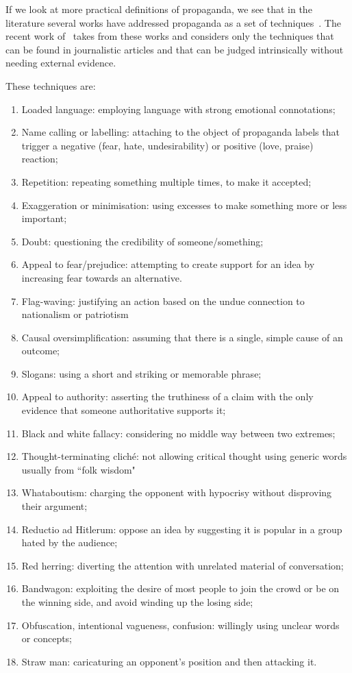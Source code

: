 If we look at more practical definitions of propaganda, we see that in the literature several works have addressed propaganda as a set of techniques~\citep{torok2015symbiotic,miller1939techniques,weston2018rulebook}. The recent work of~\citet{da2019fine} takes from these works and considers only the techniques that can be found in journalistic articles and that can be judged intrinsically without needing external evidence.

These techniques are:
\begin{enumerate}
    \item Loaded language: employing language with strong emotional connotations;
    \item Name calling or labelling: attaching to the object of propaganda labels that trigger a negative (fear, hate, undesirability) or positive (love, praise) reaction;
    \item Repetition: repeating something multiple times, to make it accepted;
    \item Exaggeration or minimisation: using excesses to make something more or less important;
    \item Doubt: questioning the credibility of someone/something;
    \item Appeal to fear/prejudice: attempting to create support for an idea by increasing fear towards an alternative.
    \item Flag-waving: justifying an action based on the undue connection to nationalism or patriotism
    \item Causal oversimplification: assuming that there is a single, simple cause of an outcome;
    \item Slogans: using a short and striking or memorable phrase;
    \item Appeal to authority: asserting the truthiness of a claim with the only evidence that someone authoritative supports it;
    \item Black and white fallacy: considering no middle way between two extremes;
    \item Thought-terminating cliché: not allowing critical thought using generic words usually from ``folk wisdom"
    \item Whataboutism: charging the opponent with hypocrisy without disproving their argument;
    \item Reductio ad Hitlerum: oppose an idea by suggesting it is popular in a group hated by the audience;
    \item Red herring: diverting the attention with unrelated material of conversation;
    \item Bandwagon: exploiting the desire of most people to join the crowd or be on the winning side, and avoid winding up the losing side;
    \item Obfuscation, intentional vagueness, confusion: willingly using unclear words or concepts; 
    \item Straw man: caricaturing an opponent's position and then attacking it.
\end{enumerate}


